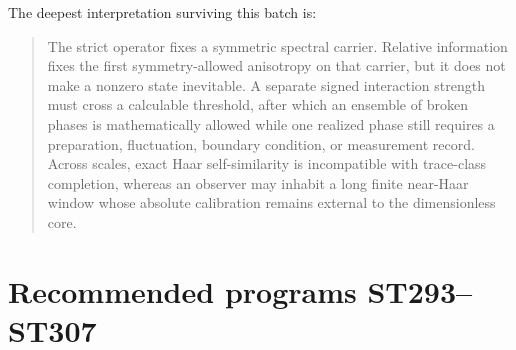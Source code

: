 \documentclass[11pt,a4paper]{article}
\begin{document}
The deepest interpretation surviving this batch is:
\begin{quote}
The strict operator fixes a symmetric spectral carrier. Relative information fixes the
first symmetry-allowed anisotropy on that carrier, but it does not make a nonzero state
inevitable. A separate signed interaction strength must cross a calculable threshold, after
which an ensemble of broken phases is mathematically allowed while one realized phase still
requires a preparation, fluctuation, boundary condition, or measurement record. Across
scales, exact Haar self-similarity is incompatible with trace-class completion, whereas an
observer may inhabit a long finite near-Haar window whose absolute calibration remains
external to the dimensionless core.
\end{quote}

\section{Recommended programs ST293--ST307}
\end{document}
